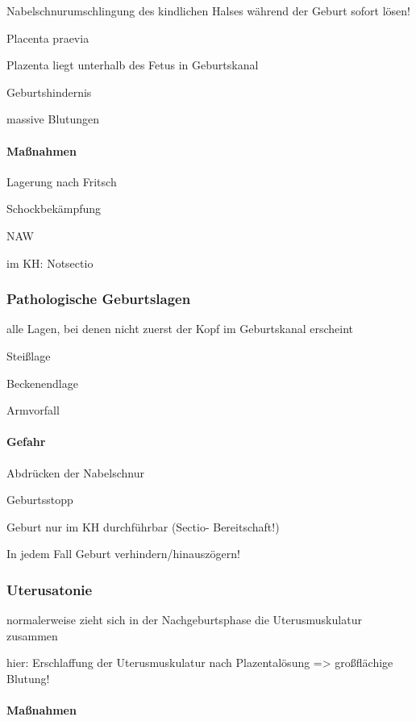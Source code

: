 Nabelschnurumschlingung des  kindlichen Halses während der Geburt 
sofort lösen!

Placenta praevia

Plazenta liegt unterhalb des Fetus in  Geburtskanal

Geburtshindernis

massive Blutungen

\paragraph{Ma{\ss}nahmen}

Lagerung nach Fritsch

Schockbekämpfung

NAW

im KH: Notsectio

\subsubsection{Pathologische Geburtslagen}

alle Lagen, bei denen nicht zuerst der  Kopf im Geburtskanal erscheint 

Stei{\ss}lage

Beckenendlage

Armvorfall

\paragraph{Gefahr}

Abdr\"ucken der Nabelschnur

Geburtsstopp

Geburt nur im KH durchf\"uhrbar (Sectio- Bereitschaft!)

In jedem Fall Geburt  verhindern/hinauszögern!

\subsubsection{Uterusatonie}

normalerweise zieht sich in der  Nachgeburtsphase die Uterusmuskulatur 
zusammen

hier: Erschlaffung der Uterusmuskulatur  nach Plazentalösung
={\textgreater} gro{\ss}flächige  Blutung!

\paragraph{Ma{\ss}nahmen}

